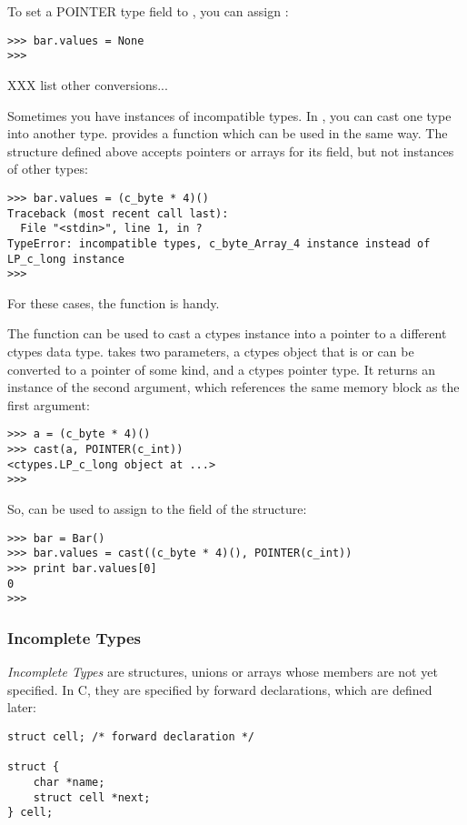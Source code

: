 To set a POINTER type field to , you can assign :
\begin{verbatim}
>>> bar.values = None
>>>
\end{verbatim}

XXX list other conversions...

Sometimes you have instances of incompatible types.  In , you can
cast one type into another type.   provides a 
function which can be used in the same way.  The  structure
defined above accepts  pointers or  arrays
for its  field, but not instances of other types:
\begin{verbatim}
>>> bar.values = (c_byte * 4)()
Traceback (most recent call last):
  File "<stdin>", line 1, in ?
TypeError: incompatible types, c_byte_Array_4 instance instead of LP_c_long instance
>>>
\end{verbatim}

For these cases, the  function is handy.

The  function can be used to cast a ctypes instance into a
pointer to a different ctypes data type.   takes two
parameters, a ctypes object that is or can be converted to a pointer
of some kind, and a ctypes pointer type.  It returns an instance of
the second argument, which references the same memory block as the
first argument:
\begin{verbatim}
>>> a = (c_byte * 4)()
>>> cast(a, POINTER(c_int))
<ctypes.LP_c_long object at ...>
>>>
\end{verbatim}

So,  can be used to assign to the  field of 
the structure:
\begin{verbatim}
>>> bar = Bar()
>>> bar.values = cast((c_byte * 4)(), POINTER(c_int))
>>> print bar.values[0]
0
>>>
\end{verbatim}


\subsubsection{Incomplete Types\label{ctypes-incomplete-types}}

\emph{Incomplete Types} are structures, unions or arrays whose members are
not yet specified. In C, they are specified by forward declarations, which
are defined later:
\begin{verbatim}
struct cell; /* forward declaration */

struct {
    char *name;
    struct cell *next;
} cell;
\end{verbatim}

